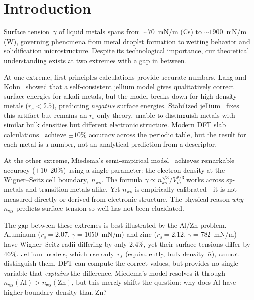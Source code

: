 \documentclass[twocolumn,showpacs,preprintnumbers,amsmath,amssymb,prb]{revtex4-2}
\begin{document}

\maketitle


\section{Introduction}
\label{sec:intro}

Surface tension~$\gamma$ of liquid metals spans from
$\sim\!70$~mN/m (Cs) to $\sim\!1900$~mN/m (W),
governing phenomena from metal droplet formation to
wetting behavior and solidification microstructure.
Despite its technological importance, our theoretical
understanding exists at two extremes with a gap in between.

At one extreme, first-principles calculations provide
accurate numbers.
Lang and Kohn~\cite{LangKohn1970} showed that a
self-consistent jellium model gives qualitatively correct
surface energies for alkali metals,
but the model breaks down for high-density metals
($r_s < 2.5$), predicting \emph{negative} surface energies.
Stabilized jellium~\cite{Perdew1990} fixes this artifact
but remains an $r_s$-only theory, unable to distinguish metals
with similar bulk densities but different electronic structure.
Modern DFT slab calculations~\cite{Vitos1998,SinghMiller2009,Tran2016}
achieve $\pm 10\%$ accuracy across the periodic table,
but the result for each metal is a number,
not an analytical prediction from a descriptor.

At the other extreme, Miedema's semi-empirical
model~\cite{Miedema1978,deBoer1988} achieves remarkable accuracy
($\pm 10$--$20\%$) using a single parameter:
the electron density at the Wigner--Seitz cell
boundary,~$n_\mathrm{ws}$.
The formula $\gamma \propto n_\mathrm{ws}^{5/3} / V_m^{2/3}$
works across sp-metals and transition metals alike.
Yet $n_\mathrm{ws}$ is empirically calibrated---it is not
measured directly or derived from electronic structure.
The physical reason \emph{why} $n_\mathrm{ws}$ predicts
surface tension so well has not been elucidated.

The gap between these extremes is best illustrated by
the Al/Zn problem.
Aluminum ($r_s = 2.07$, $\gamma = 1050$~mN/m) and
zinc ($r_s = 2.12$, $\gamma = 782$~mN/m)
have Wigner--Seitz radii differing by only 2.4\%,
yet their surface tensions differ by 46\%.
Jellium models, which use only~$r_s$ (equivalently, bulk
density~$\bar{n}$), cannot distinguish them.
DFT can compute the correct values, but provides no
single variable that \emph{explains} the difference.
Miedema's model resolves it through
$n_\mathrm{ws}(\mathrm{Al}) > n_\mathrm{ws}(\mathrm{Zn})$,
but this merely shifts the question:
why does Al have higher boundary density than Zn?
\end{document}
